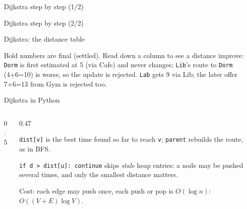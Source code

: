 \documentclass[aspectratio=169,10pt]{beamer}
\newcommand{\pycodes}[2]{}
\begin{document}
\begin{frame}{Dijkstra step by step (1/2)}

\end{frame}

\begin{frame}{Dijkstra step by step (2/2)}

\end{frame}

\begin{frame}{Dijkstra: the distance table}
\begin{center}
\small
\end{center}
\vspace{2mm}
{\small
Bold numbers are final (settled). Read down a column to see a distance improve: \texttt{Dorm} is first estimated at 5 (via Cafe) and never changes; \texttt{Lib}'s route to \texttt{Dorm} (4+6=10) is worse, so the update is rejected. \texttt{Lab} gets 9 via Lib; the later offer 7+6=13 from Gym is rejected too.}
\end{frame}

\begin{frame}{Dijkstra in Python}
\begin{columns}[T]
\begin{column}{0.5\textwidth}
\pycodes{\fontsize{7.2}{8.6}}{dijkstra}
\end{column}
\begin{column}{0.47\textwidth}
\vspace{2mm}
{\small
\texttt{dist[v]} is the best time found so far to reach \texttt{v}; \texttt{parent} rebuilds the route, as in BFS.

\vspace{2mm}
\texttt{if d > dist[u]: continue} skips \emph{stale} heap entries: a node may be pushed several times, and only the smallest distance matters.

\vspace{2mm}
Cost: each edge may push once, each push or pop is $O(\log n)$: $O((V+E)\log V)$.}
\end{column}
\end{columns}
\end{frame}
\end{document}
